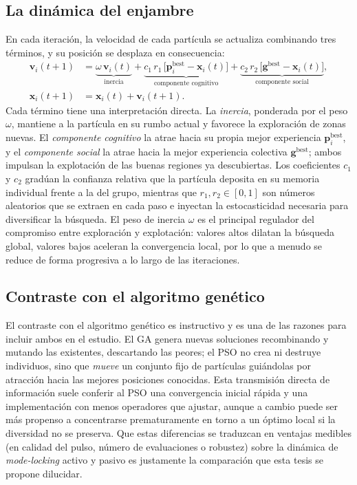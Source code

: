 \subsection{La dinámica del enjambre}
\label{sec:pso_dinamica}

En cada iteración, la velocidad de cada partícula se actualiza combinando tres
términos, y su posición se desplaza en consecuencia:
%
\begin{align}
    \mathbf{v}_i(t+1) &= \underbrace{\omega\,\mathbf{v}_i(t)}_{\text{inercia}}
    + \underbrace{c_1\,r_1\,\bigl[\mathbf{p}_i^{\text{best}}-\mathbf{x}_i(t)\bigr]}_{\text{componente cognitivo}}
    + \underbrace{c_2\,r_2\,\bigl[\mathbf{g}^{\text{best}}-\mathbf{x}_i(t)\bigr]}_{\text{componente social}},
    \label{eq:pso_velocidad}\\[4pt]
    \mathbf{x}_i(t+1) &= \mathbf{x}_i(t) + \mathbf{v}_i(t+1).
    \label{eq:pso_posicion}
\end{align}
%
Cada término tiene una interpretación directa. La \emph{inercia}, ponderada por el
peso $\omega$, mantiene a la partícula en su rumbo actual y favorece la exploración
de zonas nuevas. El \emph{componente cognitivo} la atrae hacia su propia mejor
experiencia $\mathbf{p}_i^{\text{best}}$, y el \emph{componente social} la atrae
hacia la mejor experiencia colectiva $\mathbf{g}^{\text{best}}$; ambos impulsan la
explotación de las buenas regiones ya descubiertas. Los coeficientes $c_1$ y $c_2$
gradúan la confianza relativa que la partícula deposita en su memoria individual
frente a la del grupo, mientras que $r_1,r_2\in[0,1]$ son números aleatorios que se
extraen en cada paso e inyectan la estocasticidad necesaria para diversificar la
búsqueda. El peso de inercia $\omega$ es el principal regulador del compromiso
entre exploración y explotación: valores altos dilatan la búsqueda global, valores
bajos aceleran la convergencia local, por lo que a menudo se reduce de forma
progresiva a lo largo de las iteraciones.

\subsection{Contraste con el algoritmo genético}
\label{sec:pso_topologia}


El contraste con el algoritmo genético es instructivo y es una de las razones para
incluir ambos en el estudio. El GA genera nuevas soluciones recombinando y mutando
las existentes, descartando las peores; el PSO no crea ni destruye individuos, sino
que \emph{mueve} un conjunto fijo de partículas guiándolas por atracción hacia las
mejores posiciones conocidas. Esta transmisión directa de información suele
conferir al PSO una convergencia inicial rápida y una implementación con menos
operadores que ajustar, aunque a cambio puede ser más propenso a concentrarse
prematuramente en torno a un óptimo local si la diversidad no se preserva. Que estas
diferencias se traduzcan en ventajas medibles (en calidad del pulso, número de
evaluaciones o robustez) sobre la dinámica de \emph{mode-locking} activo y pasivo es
justamente la comparación que esta tesis se propone dilucidar.


